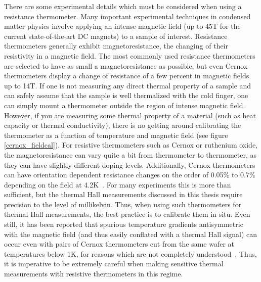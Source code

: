 \documentclass{thesis-umich}
\begin{document}
There are some experimental details which must be considered when using a
resistance thermometer. Many important experimental techniques in condensed
matter physics involve applying an intense magnetic field (up to 45T for the
current state-of-the-art DC magnets) to a sample of interest. Resistance
thermometers generally exhibit magnetoresistance, the changing of their
resistivity in a magnetic field. The most commonly used resistance thermometers
are selected to have as small a magnetoresistance as possible, but even Cernox
thermometers display a change of resistance of a few percent in magnetic fields
up to 14T. If one is not measuring any direct thermal property of a sample and
can safely assume that the sample is well thermalized with the cold finger, one
can simply mount a thermometer outside the region of intense magnetic field.
However, if you are measuring some thermal property of a material (such as heat
capacity or thermal conductivity), there is no getting around calibrating the
thermometer as a function of temperature and magnetic field (see figure
\ref{cernox_fieldcal}). For resistive thermometers such as Cernox or ruthenium
oxide, the magnetoresistance can vary quite a bit from thermometer to
thermometer, as they can have slightly different doping levels. Additionally,
Cernox thermometers can have orientation dependent resistance changes on the
order of 0.05\% to 0.7\% depending on the field at 4.2K~\cite{Brandt1999}. For
many experiments this is more than sufficient, but the thermal Hall measurements
discussed in this thesis require precision to the level of millikelvin. Thus,
when using such thermometers for thermal Hall measurements, the best practice
is to calibrate them in situ. Even still, it has been reported that spurious
temperature gradients antisymmetric with the magnetic field (and thus easily
conflated with a thermal Hall signal) can occur even with pairs of Cernox
thermometers cut from the same wafer at temperatures below 1K, for reasons
which are not completely understood~\cite{HirschbergerThesis}. Thus, it is
imperative to be extremely careful when making sensitive thermal measurements
with resistive thermometers in this regime.
\end{document}
